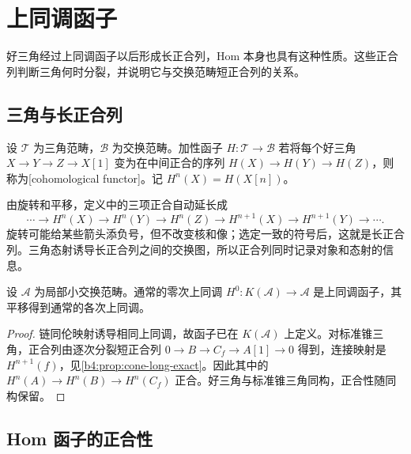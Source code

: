 
\section{上同调函子}
\label{b4:sec:1603}

好三角经过上同调函子以后形成长正合列，Hom 本身也具有这种性质。这些正合列判断三角何时分裂，并说明它与交换范畴短正合列的关系。


%
%

\subsection{三角与长正合列}
\label{b4:subsec:1603:01}

\begin{definition}\label{b4:def:cohomological-functor}
	设 \(\mathcal T\) 为三角范畴，\(\mathcal B\) 为交换范畴。加性函子 \(H:\mathcal T\to\mathcal B\) 若将每个好三角 \(X\to Y\to Z\to X[1]\) 变为在中间正合的序列 \(H(X)\to H(Y)\to H(Z)\)，则称为[cohomological functor]。记 \(H^n(X)=H(X[n])\)。
\end{definition}

由旋转和平移，定义中的三项正合自动延长成
\[
	\cdots\to H^n(X)\to H^n(Y)\to H^n(Z) \to H^{n+1}(X)\to H^{n+1}(Y)\to\cdots.
\]
旋转可能给某些箭头添负号，但不改变核和像；选定一致的符号后，这就是长正合列。三角态射诱导长正合列之间的交换图，所以正合列同时记录对象和态射的信息。

\begin{proposition}\label{b4:prop:cohomology-on-homotopy}
	设 \(\mathcal A\) 为局部小交换范畴。通常的零次上同调 \(H^0:K(\mathcal A)\to\mathcal A\) 是上同调函子，其平移得到通常的各次上同调。
\end{proposition}
\begin{proof}
	链同伦映射诱导相同上同调，故函子已在 \(K(\mathcal A)\) 上定义。对标准锥三角，正合列由逐次分裂短正合列 \(0\to B\to C_f\to A[1]\to0\) 得到，连接映射是 \(H^{n+1}(f)\)，见\cref{b4:prop:cone-long-exact}。因此其中的 \(H^n(A)\to H^n(B)\to H^n(C_f)\) 正合。好三角与标准锥三角同构，正合性随同构保留。
\end{proof}

\subsection{Hom 函子的正合性}
\label{b4:subsec:1603:02}

